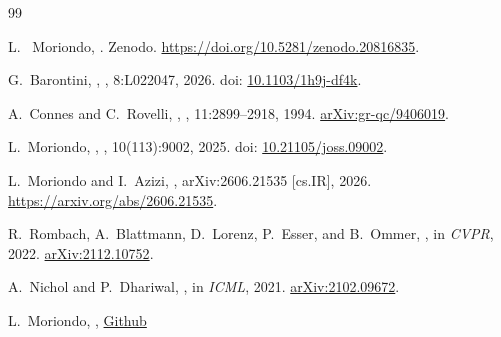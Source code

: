 \documentclass[11pt]{article}
\begin{document}
    \newpage
    \begin{thebibliography}{99}

    L.~ Moriondo,
    .
    \newblock Zenodo.
    \newblock \url{https://doi.org/10.5281/zenodo.20816835}.

    G.~Barontini,
    ,
    , 8:L022047, 2026.
    \newblock doi: \href{https://doi.org/10.1103/1h9j-df4k}{10.1103/1h9j-df4k}.

    A.~Connes and C.~Rovelli,
    ,
    , 11:2899--2918, 1994.
    \newblock \href{https://arxiv.org/abs/gr-qc/9406019}{arXiv:gr-qc/9406019}.

    L.~Moriondo,
    ,
    , 10(113):9002, 2025.
    \newblock doi: \href{https://doi.org/10.21105/joss.09002}{10.21105/joss.09002}.

    L.~Moriondo and I.~Azizi,
    ,
    \newblock arXiv:2606.21535 [cs.IR], 2026.
    \newblock \href{https://arxiv.org/abs/2606.21535}{https://arxiv.org/abs/2606.21535}.

    R.~Rombach, A.~Blattmann, D.~Lorenz, P.~Esser, and B.~Ommer,
    ,
    \newblock in {\em CVPR}, 2022.
    \newblock \href{https://arxiv.org/abs/2112.10752}{arXiv:2112.10752}.

    A.~Nichol and P.~Dhariwal,
    ,
    \newblock in {\em ICML}, 2021.
    \newblock \href{https://arxiv.org/abs/2102.09672}{arXiv:2102.09672}.

    L.~Moriondo,
    ,
    \newblock \href{https://github.com/tuned-org-uk/entropic-semantic-diffusion}{Github}


\end{thebibliography}
\end{document}
